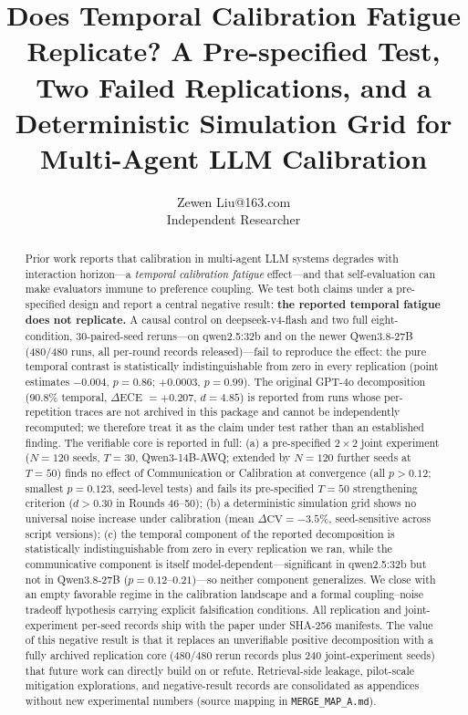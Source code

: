 \documentclass[11pt]{article}
\title{Does Temporal Calibration Fatigue Replicate? A Pre-specified Test, Two Failed Replications, and a Deterministic Simulation Grid for Multi-Agent LLM Calibration}
\author{\name Zewen Liu\email 17353895263@163.com\\\addr Independent Researcher}
\date{}
\newcommand{\CV}{\ensuremath{\mathrm{CV}}}
\theoremstyle{definition}
\theoremstyle{remark}
\begin{document}
\maketitle

\begin{abstract}
Prior work reports that calibration in multi-agent LLM systems degrades with interaction horizon---a \textit{temporal calibration fatigue} effect---and that self-evaluation can make evaluators immune to preference coupling. We test both claims under a pre-specified design and report a central negative result: \textbf{the reported temporal fatigue does not replicate.} A causal control on deepseek-v4-flash and two full eight-condition, 30-paired-seed reruns---on qwen2.5:32b and on the newer Qwen3.8-27B (480/480 runs, all per-round records released)---fail to reproduce the effect: the pure temporal contrast is statistically indistinguishable from zero in every replication (point estimates $-0.004$, $p = 0.86$; $+0.0003$, $p = 0.99$). The original GPT-4o decomposition (90.8\% temporal, $\Delta$ECE $= +0.207$, $d = 4.85$) is reported from runs whose per-repetition traces are not archived in this package and cannot be independently recomputed; we therefore treat it as the claim under test rather than an established finding. The verifiable core is reported in full: (a) a pre-specified $2 \times 2$ joint experiment ($N{=}120$ seeds, $T{=}30$, Qwen3-14B-AWQ; extended by $N{=}120$ further seeds at $T{=}50$) finds no effect of Communication or Calibration at convergence (all $p > 0.12$; smallest $p = 0.123$, seed-level tests) and fails its pre-specified $T{=}50$ strengthening criterion ($d > 0.30$ in Rounds 46--50); (b) a deterministic simulation grid shows no universal noise increase under calibration (mean $\Delta\CV = -3.5\%$, seed-sensitive across script versions); (c) the temporal component of the reported decomposition is statistically indistinguishable from zero in every replication we ran, while the communicative component is itself model-dependent---significant in qwen2.5:32b but not in Qwen3.8-27B ($p = 0.12$--$0.21$)---so neither component generalizes. We close with an empty favorable regime in the calibration landscape and a formal coupling--noise tradeoff hypothesis carrying explicit falsification conditions. All replication and joint-experiment per-seed records ship with the paper under SHA-256 manifests. The value of this negative result is that it replaces an unverifiable positive decomposition with a fully archived replication core (480/480 rerun records plus 240 joint-experiment seeds) that future work can directly build on or refute. Retrieval-side leakage, pilot-scale mitigation explorations, and negative-result records are consolidated as appendices without new experimental numbers (source mapping in \texttt{MERGE\_MAP\_A.md}).
\end{abstract}
\end{document}
